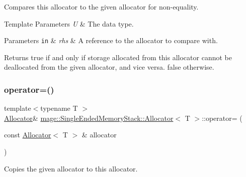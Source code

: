Compares this allocator to the given allocator for non-\/equality.


\begin{DoxyTemplParams}{Template Parameters}
{\em U} & The data type. \\
\hline
\end{DoxyTemplParams}

\begin{DoxyParams}[1]{Parameters}
\mbox{\tt in}  & {\em rhs} & A reference to the allocator to compare with. \\
\hline
\end{DoxyParams}
\begin{DoxyReturn}{Returns}
{\ttfamily true} if and only if storage allocated from this allocator cannot be deallocated from the given allocator, and vice versa. {\ttfamily false} otherwise. 
\end{DoxyReturn}
\mbox{\label{classmage_1_1_single_ended_memory_stack_1_1_allocator_aa124f846e082080f12330255ffb3d360}} 
\subsubsection{\texorpdfstring{operator=()}{operator=()}\hspace{0.1cm}{\footnotesize\ttfamily [1/2]}}
{\footnotesize\ttfamily template$<$typename T $>$ \\
\mbox{\hyperlink{classmage_1_1_single_ended_memory_stack_1_1_allocator}{Allocator}}\& \mbox{\hyperlink{classmage_1_1_single_ended_memory_stack_1_1_allocator}{mage\+::\+Single\+Ended\+Memory\+Stack\+::\+Allocator}}$<$ T $>$\+::operator= (\begin{DoxyParamCaption}\item[{const \mbox{\hyperlink{classmage_1_1_single_ended_memory_stack_1_1_allocator}{Allocator}}$<$ T $>$ \&}]{allocator }\end{DoxyParamCaption})\hspace{0.3cm}{\ttfamily [delete]}}

Copies the given allocator to this allocator.


